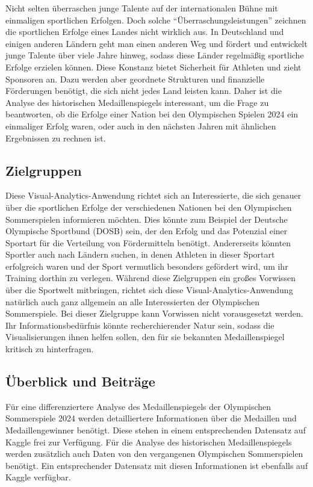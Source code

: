 Nicht selten überraschen junge Talente auf der internationalen Bühne mit einmaligen sportlichen Erfolgen. Doch solche \enquote{Überraschungsleistungen} zeichnen die sportlichen Erfolge eines Landes nicht wirklich aus. In Deutschland und einigen anderen Ländern geht man einen anderen Weg und fördert und entwickelt junge Talente über viele Jahre hinweg, sodass diese Länder regelmäßig sportliche Erfolge erzielen können. Diese Konstanz bietet Sicherheit für Athleten und zieht Sponsoren an. Dazu werden aber geordnete Strukturen und finanzielle Förderungen benötigt, die sich nicht jedes Land leisten kann. Daher ist die Analyse des historischen Medaillenspiegels interessant, um die Frage zu beantworten, ob die Erfolge einer Nation bei den Olympischen Spielen 2024 ein einmaliger Erfolg waren, oder auch in den nächsten Jahren mit ähnlichen Ergebnissen zu rechnen ist.

\subsection{Zielgruppen}
Diese Visual-Analytics-Anwendung richtet sich an Interessierte, die sich genauer über die sportlichen Erfolge der verschiedenen Nationen bei den Olympischen Sommerspielen informieren möchten. Dies könnte zum Beispiel der Deutsche Olympische Sportbund (DOSB) sein, der den Erfolg und das Potenzial einer Sportart für die Verteilung von Fördermitteln benötigt. Andererseits könnten Sportler auch nach Ländern suchen, in denen Athleten in dieser Sportart erfolgreich waren und der Sport vermutlich besonders gefördert wird, um ihr Training dorthin zu verlegen. Während diese Zielgruppen ein großes Vorwissen über die Sportwelt mitbringen, richtet sich diese Visual-Analytics-Anwendung natürlich auch ganz allgemein an alle Interessierten der Olympischen Sommerspiele. Bei dieser Zielgruppe kann Vorwissen nicht vorausgesetzt werden. Ihr Informationsbedürfnis könnte recherchierender Natur sein, sodass die Visualisierungen ihnen helfen sollen, den für sie bekannten Medaillenspiegel kritisch zu hinterfragen.

\subsection{Überblick und Beiträge}
Für eine differenziertere Analyse des Medaillenspiegels der Olympischen Sommerspiele 2024 werden detailliertere Informationen über die Medaillen und Medaillengewinner benötigt. Diese stehen in einem entsprechenden Datensatz auf Kaggle \cite{kaggleOly24} frei zur Verfügung. Für die Analyse des historischen Medaillenspiegels werden zusätzlich auch Daten von den vergangenen Olympischen Sommerspielen benötigt. Ein entsprechender Datensatz mit diesen Informationen ist ebenfalls auf Kaggle \cite{kaggleOlyHist} verfügbar.

